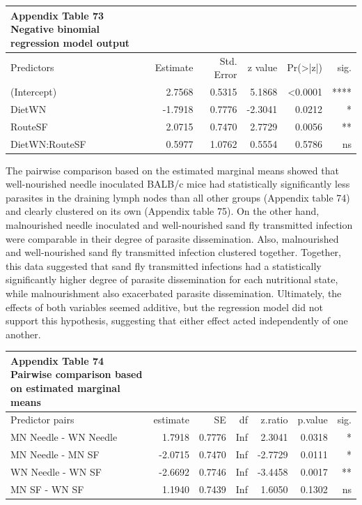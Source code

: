 \documentclass[
  12pt,
  letterpaper,
]{article}
\begin{document}
\begingroup
\fontsize{12.0pt}{14.4pt}\selectfont
\begin{longtable}{l|rrrrr}
\caption*{
{\large \textbf{Appendix Table 73}} \\ 
{\small \textbf{Negative binomial regression model output}}
} \\ 
\toprule
Predictors & {Estimate} & {Std. Error} & {z value} & {Pr(>|z|)} & {sig.} \\ 
\midrule\addlinespace[2.5pt]
(Intercept) & 2.7568 & 0.5315 & 5.1868 & <0.0001 & **** \\ 
DietWN & -1.7918 & 0.7776 & -2.3041 & 0.0212 & * \\ 
RouteSF & 2.0715 & 0.7470 & 2.7729 & 0.0056 & ** \\ 
DietWN:RouteSF & 0.5977 & 1.0762 & 0.5554 & 0.5786 & ns \\ 
\bottomrule
\end{longtable}
\endgroup

The pairwise comparison based on the estimated marginal means showed that well-nourished needle inoculated BALB/c mice had statistically significantly less parasites in the draining lymph nodes than all other groups (Appendix table 74) and clearly clustered on its own (Appendix table 75). On the other hand, malnourished needle inoculated and well-nourished sand fly transmitted infection were comparable in their degree of parasite dissemination. Also, malnourished and well-nourished sand fly transmitted infection clustered together. Together, this data suggested that sand fly transmitted infections had a statistically significantly higher degree of parasite dissemination for each nutritional state, while malnourishment also exacerbated parasite dissemination. Ultimately, the effects of both variables seemed additive, but the regression model did not support this hypothesis, suggesting that either effect acted independently of one another.

\begingroup
\fontsize{12.0pt}{14.4pt}\selectfont
\begin{longtable}{l|rrrrrr}
\caption*{
{\large \textbf{Appendix Table 74}} \\ 
{\small \textbf{Pairwise comparison based on estimated marginal means}}
} \\ 
\toprule
Predictor pairs & {estimate} & {SE} & {df} & {z.ratio} & {p.value} & {sig.} \\ 
\midrule\addlinespace[2.5pt]
MN Needle - WN Needle & 1.7918 & 0.7776 & Inf & 2.3041 & 0.0318 & * \\ 
MN Needle - MN SF & -2.0715 & 0.7470 & Inf & -2.7729 & 0.0111 & * \\ 
WN Needle - WN SF & -2.6692 & 0.7746 & Inf & -3.4458 & 0.0017 & ** \\ 
MN SF - WN SF & 1.1940 & 0.7439 & Inf & 1.6050 & 0.1302 & ns \\ 
\bottomrule
\end{longtable}
\endgroup
\end{document}

